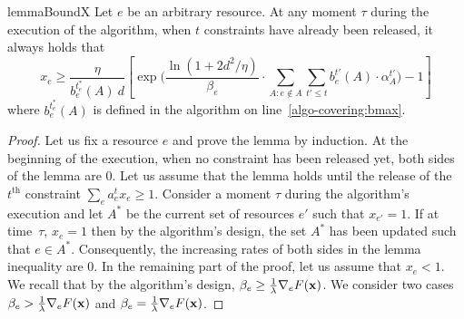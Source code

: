 \begin{restatable}{lemma}{BoundX}
\label{lem:bound-x}
Let $e$ be an arbitrary resource.
At any moment $\tau$ during the execution of the algorithm,
when $t$ constraints have already been released, it always holds that
$$
x_{e}	\geq  \frac{\eta}{b^{t_{e}^{*}}_{e}(A) \ d}
		\left[ \exp\biggl( \frac{\ln(1+2d^{2}/\eta)}{\beta_{e}}
				\cdot \sum_{A: e \notin A} \sum_{t' \le t} b^{t'}_{e}(A) \cdot \alpha^{t'}_{A} \biggr) - 1 \right]
$$
where $b^{t_{e}^{*}}_{e}(A)$ is defined in the algorithm on line~\ref{algo-covering:bmax}.
\end{restatable}
\begin{proof}
	Let us fix a resource $e$ and prove the lemma by induction. At the beginning of the execution, when no constraint has been released yet, both sides of the lemma are 0.
	Let us assume that the lemma holds until the release of the $t^{\text{th}}$ constraint $\sum_{e} a^{t}_{e} x_{e} \geq 1$.
	Consider a moment $\tau$ during the algorithm's execution
	and let $A^{*}$ be the current set of resources $e'$ such that $x_{e'} = 1$.
	If at time~$\tau$, $x_{e} = 1$ then by the algorithm's design, the set $A^{*}$ has been updated such that
	$e \in A^{*}$. Consequently, the increasing rates of both sides in the lemma inequality are 0.
	In the remaining part of the proof, let us assume that  $x_{e} < 1$.
	We recall that by the algorithm's design, $\beta_{e} \geq \frac{1}{\lambda} \nabla_{e} F(\mathbf{x})$.
	We consider two cases $\beta_{e} > \frac{1}{\lambda} \nabla_{e} F(\mathbf{x})$
	and $\beta_{e} = \frac{1}{\lambda} \nabla_{e} F(\mathbf{x})$.


\end{proof}
